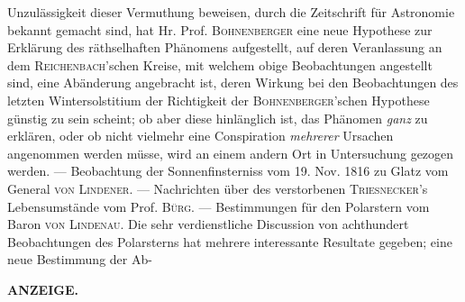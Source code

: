 Unzulässigkeit dieser Vermuthung beweisen, durch die Zeitschrift für Astronomie bekannt gemacht sind, hat Hr. Prof. \textsc{Bohnenberger} eine neue Hypothese zur Erklärung des räthselhaften Phänomens aufgestellt, auf deren Veranlassung an dem \textsc{Reichenbach}'schen Kreise, mit welchem obige Beobachtungen angestellt sind, eine Abänderung angebracht ist, deren Wirkung bei den Beobachtungen des letzten Wintersolstitium der Richtigkeit der \textsc{Bohnenberger}'schen Hypothese günstig zu sein scheint; ob aber diese hinlänglich ist, das Phänomen \emph{ganz} zu erklären, oder ob nicht vielmehr eine Conspiration \emph{mehrerer} Ursachen angenommen werden müsse, wird an einem andern Ort in Untersuchung gezogen werden. --- Beobachtung der Sonnenfinsterniss vom 19. Nov. 1816 zu Glatz vom General \textsc{von Lindener}. --- Nachrichten über des verstorbenen \textsc{Triesnecker}'s Lebensumstände vom Prof. \textsc{Bürg}. --- Bestimmungen für den Polarstern vom Baron \textsc{von Lindenau}. Die sehr verdienstliche Discussion von achthundert Beobachtungen des Polarsterns hat mehrere interessante Resultate gegeben; eine neue Bestimmung der Ab-\par
\clearpage
\thispagestyle{empty}
\noindent{}%
%
\parbox[t]{\dimexpr\linewidth-24mm\relax}{\centering\footnotesize\bfseries ANZEIGE.\par}%
\makebox[12mm][r]{}\par\medskip
